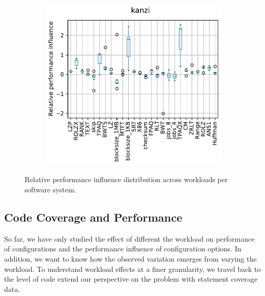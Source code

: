 \begin{figure}
\begin{minipage}{0.33\textwidth}
\begin{subfigure}{\linewidth}
		\end{subfigure}
	\end{minipage}
	\begin{minipage}{0.33\textwidth}
		\begin{subfigure}{\linewidth}
			\includegraphics[width=\linewidth]{images/rq2/relative_performance_kanzi.pdf}
			\vspace{1.19cm}
		\end{subfigure}
	\end{minipage}
	\caption{Relative performance influence distribution across workloads per software system.}
	\label{fig:feature_influence_actross_workloads}
\end{figure}

\vspace{1em}


\subsection{Code Coverage and Performance}\label{sec:rq3}
So far, we have only studied the effect of different the workload on performance of configurations and the performance influence of configuration options. In addition, we want to know how the observed variation emerges from  varying the workload. To understand workload effects at a finer granularity, we travel back to the level of code extend our perspective on the problem with statement coverage data. 

